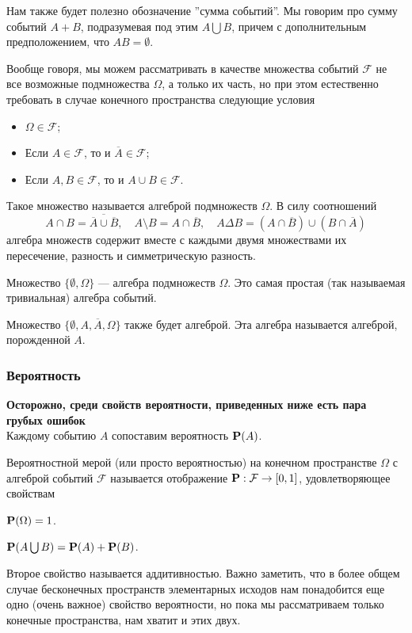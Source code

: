 \documentclass[11 pt,russian]{article}
\begin{document}
Нам также будет полезно обозначение ''сумма событий''. Мы говорим про сумму событий $A+B$, подразумевая под этим $A\bigcup B$, причем с дополнительным предположением, что $AB= \emptyset$. 

Вообще говоря, мы можем рассматривать в качестве множества событий $\mathcal{F}$ не все возможные подмножества $\Omega$, а только их часть, но при этом естественно требовать в случае конечного пространства следующие условия 
\begin{itemize}
\item $\Omega\in\mathcal{F}$; 
\item Если $A\in \mathcal{F}$, то и $\overline{A}\in \mathcal{F}$;
\item Если $A,B\in \mathcal{F}$, то и $A\cup B\in \mathcal{F}$.
\end{itemize}
Такое множество называется алгеброй подмножеств $\Omega$. В силу соотношений
$$
A\cap B = \overline{\overline{A}\cup \overline{B}},\quad
A\setminus B = A\cap \overline{B},\quad
A\Delta B = (A\cap \overline{B})\cup (B\cap \overline{A})
$$
алгебра множеств содержит вместе с каждыми двумя множествами их пересечение, разность и симметрическую разность.
\begin{Exam}
Множество $\{\emptyset, \Omega\}$ --- алгебра подмножеств $\Omega$. Это самая простая (так называемая тривиальная) алгебра событий.

Множество $\{\emptyset, A, \overline{A},\Omega\}$ также будет алгеброй. Эта алгебра называется алгеброй, порожденной $A$. 
\end{Exam}
\subsubsection{Вероятность}
{\bf Осторожно, среди свойств вероятности, приведенных ниже есть пара грубых ошибок\\ }
Каждому событию $A$ сопоставим вероятность ${\bf P}(A)$. 
\begin{Def}
Вероятностной мерой (или просто вероятностью) на конечном пространстве $\Omega$ с алгеброй событий $\mathcal{F}$ называется отображение ${\bf P}:\mathcal{F}\to [0,1]$, удовлетворяющее свойствам
\begin{enumerate*}
\item ${\bf P}(\Omega) = 1$.
\item ${\bf P}(A \bigcup B) = {\bf P}(A) + {\bf P}(B)$.
\end{enumerate*}
\end{Def}
Второе свойство называется аддитивностью. Важно заметить, что в более общем случае бесконечных пространств элементарных исходов нам понадобится еще одно (очень важное) свойство вероятности, но пока мы рассматриваем только конечные пространства, нам хватит и этих двух.
\end{document}
